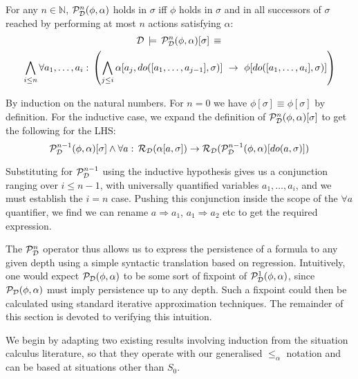 \begin{thm}
For any $n\in\mathbb{N}$, $\mathcal{P}_{\mathcal{D}}^{n}(\phi,\alpha)$ holds in
$\sigma$ iff $\phi$ holds in $\sigma$ and in all successors of
$\sigma$ reached by performing at most $n$ actions satisfying $\alpha$:\label{thm:PstN-works}\begin{multline*}
\mathcal{D}\,\models\,\mathcal{P}_{\mathcal{D}}^{n}(\phi,\alpha)[\sigma]\,\equiv\,\\
\bigwedge_{i\leq n}\forall a_{1},\dots,a_{i}:\,\left(\bigwedge_{j\leq i}\alpha[a_{j},do([a_{1},\dots,a_{j-1}],\sigma)]\,\,\rightarrow\,\,\phi[do([a_{1},\dots,a_{i}],\sigma)]\right)\end{multline*}

\end{thm}
\begin{proofsketch}
By induction on the natural numbers. For $n=0$ we have $\phi[\sigma]\equiv\phi[\sigma]$
by definition. For the inductive case, we expand the definition of
$\mathcal{P}_{\mathcal{D}}^{n}(\phi,\alpha)[\sigma]$ to get the following for the
LHS:\[
\mathcal{P}_{\mathcal{D}}^{n-1}(\phi,\alpha)[\sigma]\wedge\forall a:\,\mathcal{R}_{\mathcal{D}}(\alpha[a,\sigma])\rightarrow\mathcal{R}_{\mathcal{D}}(\mathcal{P}_{\mathcal{D}}^{n-1}(\phi,\alpha)[do(a,\sigma)])\]


Substituting for $\mathcal{P}_{\mathcal{D}}^{n-1}$ using the inductive hypothesis
gives us a conjunction ranging over $i\leq n-1$, with universally
quantified variables $a_{1},\dots,a_{i}$, and we must establish the
$i=n$ case. Pushing this conjunction inside the scope of the $\forall a$
quantifier, we find we can rename $a\Rightarrow a_{1}$, $a_{1}\Rightarrow a_{2}$
etc to get the required expression. 
\end{proofsketch}
The $\mathcal{P}_{\mathcal{D}}^{n}$ operator thus allows us to express the persistence
of a formula to any given depth using a simple syntactic translation
based on regression. Intuitively, one would expect $\mathcal{P}_{\mathcal{D}}(\phi,\alpha)$
to be some sort of fixpoint of $\mathcal{P}_{\mathcal{D}}^{1}(\phi,\alpha)$, since
$\mathcal{P}_{\mathcal{D}}(\phi,\alpha)$ must imply persistence up to any depth.
Such a fixpoint could then be calculated using standard iterative
approximation techniques. The remainder of this section is devoted
to verifying this intuition.

We begin by adapting two existing results involving induction from
the situation calculus literature, so that they operate with our generalised
$\leq_{\alpha}$ notation and can be based at situations other than
$S_{0}$.

